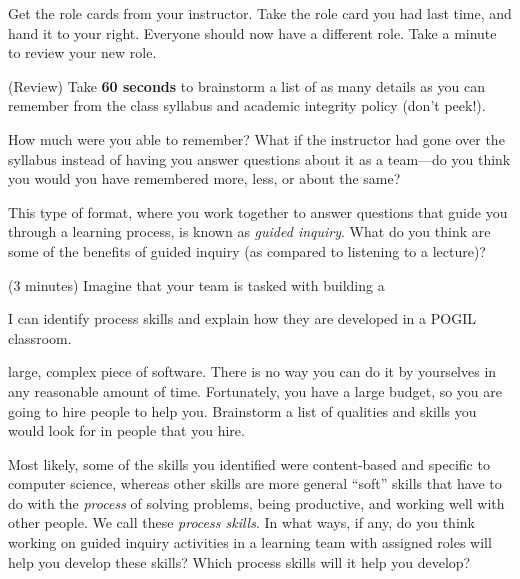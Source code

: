 \documentclass{tufte-handout}
\begin{document}
\begin{questions}
\item Get the role cards from your instructor.  Take the role card you
  had last time, and hand it to your right.  Everyone should now have
  a different role.  Take a minute to review your new role.

\item (Review) Take \textbf{60 seconds} to brainstorm a list of as
  many details as you can remember from the class syllabus and
  academic integrity policy (don't peek!).  \vspace{1in}

\item How much were you able to remember?  What if the instructor had
  gone over the syllabus instead of having you answer questions about
  it as a team---do you think you would you have remembered more,
  less, or about the same? \vspace{0.5in}

\item This type of format, where you work together to answer questions
  that guide you through a learning process, is known as \emph{guided
    inquiry}.  What do you think are some of the benefits of guided
  inquiry (as compared to listening to a lecture)?  

\newpage

\item (3 minutes) Imagine that your team is tasked with building a
\begin{objective}
  I can identify process skills and explain how they are
  developed in a POGIL classroom.
\end{objective}
  large, complex piece of software.  There is no way you can do it by
  yourselves in any reasonable amount of time.  Fortunately, you have
  a large budget, so you are going to hire people to help
  you. Brainstorm a list of qualities and skills you would look for in
  people that you hire.

\item Most likely, some of the skills you identified were
  content-based and specific to computer science, whereas other skills
  are more general ``soft'' skills that have to do with the
  \emph{process} of solving problems, being productive, and working
  well with other people.  We call these \emph{process skills}.  In
  what ways, if any, do you think working on guided inquiry activities
  in a learning team with assigned roles will help you develop these
  skills?  Which process skills will it help you develop?

\end{questions}
\end{document}
